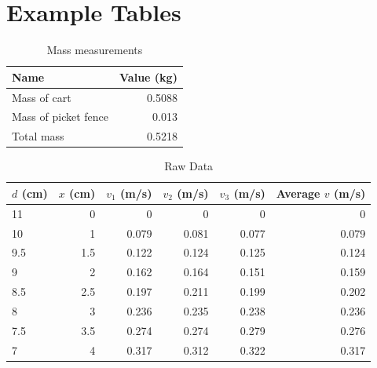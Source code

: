 \section{Example Tables}
%
\begin{table}[ht]
    \centering
    \begin{tabular}{l|r}
        \textbf{Name} & \textbf{Value} (kg) \\
        \hline
        Mass of cart & 0.5088 \\
        Mass of picket fence & 0.013 \\
        \hline
        Total mass & 0.5218 \\
        \hline
    \end{tabular}
    \caption{Mass measurements}
    \label{table:06.mass}
\end{table}
%
\begin{table}[ht]
    \centering
    \begin{tabular}{l|r|r|r|r|r}
        $d$ (cm) & $x$ (cm) & $v_{1}$ (m/s) & $v_{2}$ (m/s) & $v_{3}$ (m/s) & Average $v$ (m/s) \\
        \hline
        11 & 0 & 0 & 0 & 0 & 0 \\
        10 & 1 & 0.079 & 0.081 & 0.077 & 0.079 \\
        9.5 & 1.5 & 0.122 & 0.124 & 0.125 & 0.124 \\
        9 & 2 & 0.162 & 0.164 & 0.151 & 0.159 \\
        8.5 & 2.5 & 0.197 & 0.211 & 0.199 & 0.202 \\
        8 & 3 & 0.236 & 0.235 & 0.238 & 0.236 \\
        7.5 & 3.5 & 0.274 & 0.274 & 0.279 & 0.276 \\
        7 & 4 & 0.317 & 0.312 & 0.322 & 0.317 \\
        \hline
    \end{tabular}
    \caption{Raw Data}
    \label{table:06.data}
\end{table}
%
\newpage
